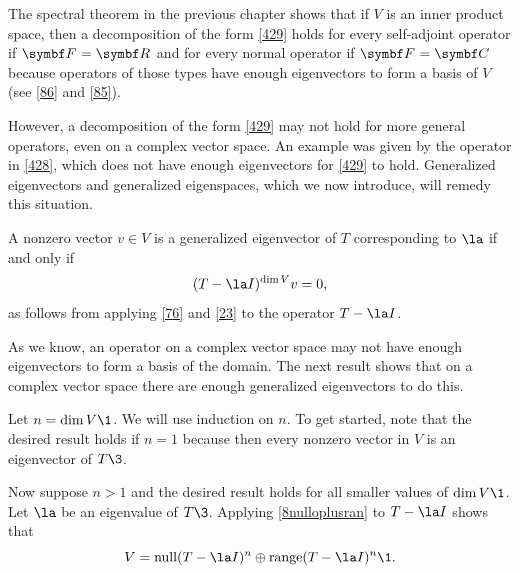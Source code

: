The spectral theorem in the previous chapter shows that if $V$ is an inner product space, then a decomposition of the form \ref{429} holds for every self-adjoint operator if $\F{} = \R{}$ and for every normal operator if $\F{} = \C{}$ because operators of those types have enough eigenvectors to form a basis of $V$ (see \ref{86} and \ref{85}).

However, a decomposition of the form \ref{429} may not
hold for more general operators, even on a complex vector space. An
example was given by the operator in \ref{428}, which does not have
enough eigenvectors for \ref{429} to hold. Generalized eigenvectors and generalized eigenspaces,
which we now introduce, will remedy this situation.



A nonzero vector $v \in V$ is a generalized eigenvector of $T$ corresponding to $\la$ if and only if
\[
(T - \la I)^{\dim V} v = 0,
\]
as follows from applying \ref{76} and \ref{23} to the operator $T  - \la I$.

As we know, an operator on a complex vector space may not have enough
eigenvectors to form a basis of the domain.  The next result shows that on a
complex vector space there are enough generalized eigenvectors to do this.


\proof
Let $n = \dim V\1$. We will use induction on $n$. To get started, note that the desired result holds if $n=1$ because then every nonzero vector in $V$ is an eigenvector of $T\3$.


Now suppose $n > 1$ and the desired result holds for all smaller values of $\dim V\1$. Let $\la$ be an eigenvalue of $T\3$. Applying \ref{8nulloplusran} to $T - \la I$ shows that
\[
V = \ker(T - \la I)^n \oplus \ran (T - \la I)^n\1.
\]

